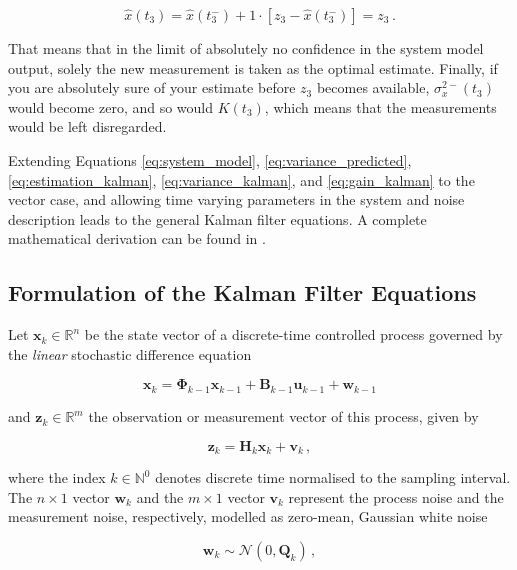 \begin{equation}\label{eq:prediction_kalman}
  \hat{x}(t_3) = \hat{x}(t^-_3) + 1 \cdot [z_3-\hat{x}(t^-_3)] = z_3\,.
\end{equation}

\noindent
That means that in the limit of absolutely no confidence in the system model output, solely the new measurement is taken as the optimal estimate. Finally, if you are absolutely sure of your estimate before $z_3$ becomes available, $\sigma^{2-}_x(t_3)$ would become zero, and so would $K(t_3)$, which means that the measurements would be left disregarded. 

Extending Equations \ref{eq:system_model}, \ref{eq:variance_predicted}, \ref{eq:estimation_kalman}, \ref{eq:variance_kalman}, and \ref{eq:gain_kalman} to the vector case, and allowing time varying parameters in the system and noise description leads to the general Kalman filter equations. A complete mathematical derivation can be found in \citeauthor{haykin2002adaptive} \cite{haykin2002adaptive}.

\subsection{Formulation of the Kalman Filter Equations} \label{sec:Kalman_equations}

Let $\bm{x}_k \in \mathbb{R}^n$ be the state vector of a discrete-time controlled process governed by the \emph{linear} stochastic difference equation 

\begin{equation}\label{eq:time_dynamical_system_plant}
  \bm{x}_k = \bm{\Phi}_{k-1}\bm{x}_{k-1}+\bm{B}_{k-1}\bm{u}_{k-1}+\bm{w}_{k-1}
\end{equation}

\noindent
and $\bm{z}_k \in \mathbb{R}^m$ the observation or measurement vector of this process, given by

\begin{equation}\label{eq:time_dynamical_system_measurement}
  \bm{z}_k = \bm{H}_{k}\bm{x}_{k}+\bm{v}_{k}\,,
\end{equation}

\noindent
where the index $k \in \mathbb{N}^0$ denotes discrete time normalised to the sampling interval. The $n\times1$ vector $\bm{w}_k$ and the $m\times1$ vector $\bm{v}_k$ represent the process noise and the measurement noise, respectively, modelled as zero-mean, Gaussian white noise

\begin{equation}\label{eq:process_noise}
  \bm{w}_{k} \sim \mathcal{N}(0,\bm{Q}_k)\,,
\end{equation}

